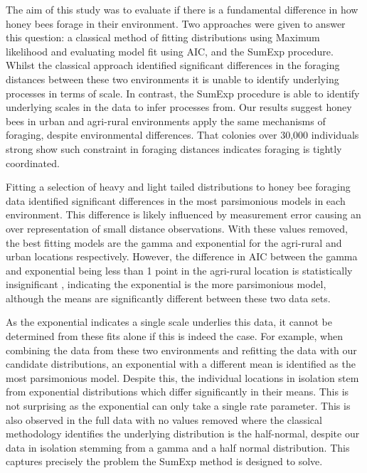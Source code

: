 \documentclass[11pt,usenames,dvipsnames,a4paper]{article}
\begin{document}
\begin{linenumbers}
\hspace{\parindent}
The aim of this study was to evaluate if there is a fundamental difference in how honey bees forage in their environment. Two approaches were given to answer this question: a classical method of fitting distributions using Maximum likelihood and evaluating model fit using AIC, and the SumExp procedure. Whilst the classical approach identified significant differences in the foraging distances between these two environments it is unable to identify underlying processes in terms of scale. In contrast, the SumExp procedure is able to identify underlying scales in the data to infer processes from. Our results suggest honey bees in urban and agri-rural environments apply the same mechanisms of foraging, despite environmental differences. That colonies over 30,000 individuals strong show such constraint in foraging distances indicates foraging is tightly coordinated.

Fitting a selection of heavy and light tailed distributions to honey bee foraging data identified significant differences in the most parsimonious models in each environment. This difference is likely influenced by measurement error causing an over representation of small distance observations. With these values removed, the best fitting models are the gamma and exponential for the agri-rural and urban locations respectively. However, the difference in AIC between the gamma and exponential being less than 1 point in the agri-rural location is statistically insignificant \citep{Burnham2004}, indicating the exponential is the more parsimonious model, although the means are significantly different between these two data sets.

As the exponential indicates a single scale underlies this data, it cannot be determined from these fits alone if this is indeed the case. For example, when combining the data from these two environments and refitting the data with our candidate distributions, an exponential with a different mean is identified as the most parsimonious model. Despite this, the individual locations in isolation stem from exponential distributions which differ significantly in their means. This is not surprising as the exponential can only take a single rate parameter. This is also observed in the full data with no values removed where the classical methodology identifies the underlying distribution is the half-normal, despite our data in isolation stemming from a gamma and a half normal distribution. This captures precisely the problem the SumExp method is designed to solve. 


\end{linenumbers}
\end{document}
